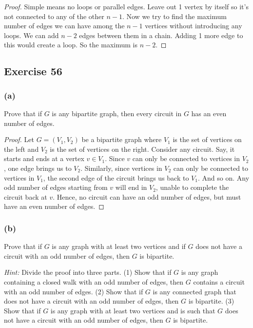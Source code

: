 \documentclass[14pt]{extarticle}
\begin{document}
\begin{proof}
Simple means no loops or parallel edges. Leave out 1 vertex by itself so it's not connected to any of the other \(n-1\). Now
we try to find the maximum number of edges we can have among the \(n-1\) vertices without introducing any loops. We can add
\(n-2\) edges between them in a chain. Adding 1 more edge to this would create a loop. So the maximum is \(n-2\).
\end{proof}

\subsection{Exercise 56}
\subsubsection{(a)}
Prove that if \(G\) is any bipartite graph, then every circuit in \(G\) has an even number of edges.

\begin{proof}
Let \(G = (V_1, V_2)\) be a bipartite graph where \(V_1\) is the set of vertices on the left and \(V_2\) is the set of 
vertices on the right. Consider any circuit. Say, it starts and ends at a vertex \(v \in V_1\). Since \(v\) can only be 
connected to vertices in \(V_2\), one edge brings us to \(V_2\). Similarly, since vertices in \(V_2\) can only be 
connected to vertices in \(V_1\), the second edge of the circuit brings us back to \(V_1\). And so on. Any odd number 
of edges starting from \(v\) will end in \(V_2\), unable to complete the circuit back at \(v\). Hence, no circuit can have
an odd number of edges, but must have an even number of edges.
\end{proof}

\subsubsection{(b)}
Prove that if \(G\) is any graph with at least two vertices and if \(G\) does not have a circuit with an odd number of 
edges, then \(G\) is bipartite.

{\it Hint:} Divide the proof into three parts. (1) Show that if \(G\) is any graph containing a closed walk with an odd 
number of edges, then \(G\) contains a circuit with an odd number of edges. (2) Show that if \(G\) is any connected graph 
that does not have a circuit with an odd number of edges, then \(G\) is bipartite. (3) Show that if \(G\) is any graph with 
at least two vertices and is such that \(G\) does not have a circuit with an odd number of edges, then \(G\) is bipartite.
\end{document}
